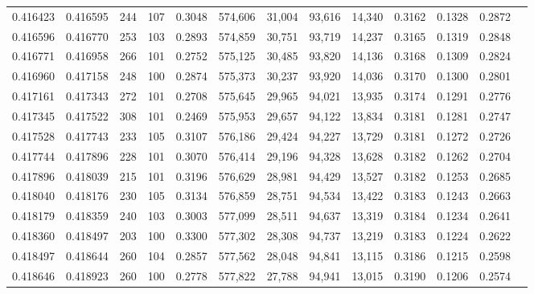 \begin{tabular}{rrrrrrrrrrrrr}
0.416423 & 0.416595 &   244 & 107 &                                     0.3048 & 574,606 &  31,004 &  93,616 &  14,340 & 0.3162 & 0.1328 & 0.2872 \\
0.416596 & 0.416770 &   253 & 103 &                                     0.2893 & 574,859 &  30,751 &  93,719 &  14,237 & 0.3165 & 0.1319 & 0.2848 \\
0.416771 & 0.416958 &   266 & 101 &                                     0.2752 & 575,125 &  30,485 &  93,820 &  14,136 & 0.3168 & 0.1309 & 0.2824 \\
0.416960 & 0.417158 &   248 & 100 &                                     0.2874 & 575,373 &  30,237 &  93,920 &  14,036 & 0.3170 & 0.1300 & 0.2801 \\
0.417161 & 0.417343 &   272 & 101 &                                     0.2708 & 575,645 &  29,965 &  94,021 &  13,935 & 0.3174 & 0.1291 & 0.2776 \\
0.417345 & 0.417522 &   308 & 101 &                                     0.2469 & 575,953 &  29,657 &  94,122 &  13,834 & 0.3181 & 0.1281 & 0.2747 \\
0.417528 & 0.417743 &   233 & 105 &                                     0.3107 & 576,186 &  29,424 &  94,227 &  13,729 & 0.3181 & 0.1272 & 0.2726 \\
0.417744 & 0.417896 &   228 & 101 &                                     0.3070 & 576,414 &  29,196 &  94,328 &  13,628 & 0.3182 & 0.1262 & 0.2704 \\
0.417896 & 0.418039 &   215 & 101 &                                     0.3196 & 576,629 &  28,981 &  94,429 &  13,527 & 0.3182 & 0.1253 & 0.2685 \\
0.418040 & 0.418176 &   230 & 105 &                                     0.3134 & 576,859 &  28,751 &  94,534 &  13,422 & 0.3183 & 0.1243 & 0.2663 \\
0.418179 & 0.418359 &   240 & 103 &                                     0.3003 & 577,099 &  28,511 &  94,637 &  13,319 & 0.3184 & 0.1234 & 0.2641 \\
0.418360 & 0.418497 &   203 & 100 &                                     0.3300 & 577,302 &  28,308 &  94,737 &  13,219 & 0.3183 & 0.1224 & 0.2622 \\
0.418497 & 0.418644 &   260 & 104 &                                     0.2857 & 577,562 &  28,048 &  94,841 &  13,115 & 0.3186 & 0.1215 & 0.2598 \\
0.418646 & 0.418923 &   260 & 100 &                                     0.2778 & 577,822 &  27,788 &  94,941 &  13,015 & 0.3190 & 0.1206 & 0.2574 \\

\end{tabular}
